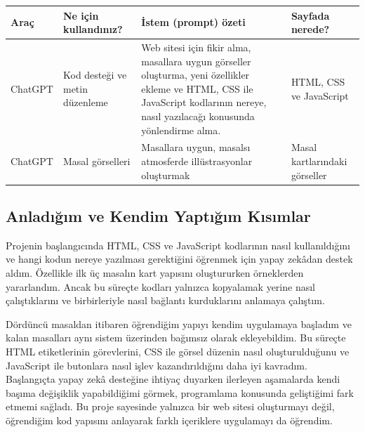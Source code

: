 \documentclass[12pt,a4paper]{article}
\begin{document}
\begin{longtable}{@{}p{2.6cm}p{3.6cm}p{4.2cm}p{3.4cm}@{}}
\toprule

\textbf{Araç} & \textbf{Ne için kullandınız?} & \textbf{İstem (prompt) özeti} & \textbf{Sayfada nerede?} \\
\midrule
\endhead
\relax ChatGPT & Kod desteği ve metin düzenleme & Web sitesi için fikir alma, masallara uygun görseller oluşturma, yeni özellikler ekleme ve HTML, CSS ile JavaScript kodlarının nereye, nasıl yazılacağı konusunda yönlendirme alma. & HTML, CSS ve JavaScript \\

\relax ChatGPT & Masal görselleri & Masallara uygun, masalsı atmosferde illüstrasyonlar oluşturmak & Masal kartlarındaki görseller \\

\bottomrule
\end{longtable}

\subsection{Anladığım ve Kendim Yaptığım Kısımlar}
Projenin başlangıcında HTML, CSS ve JavaScript kodlarının nasıl kullanıldığını ve hangi kodun nereye yazılması gerektiğini öğrenmek için yapay zekâdan destek aldım. Özellikle ilk üç masalın kart yapısını oluştururken örneklerden yararlandım. Ancak bu süreçte kodları yalnızca kopyalamak yerine nasıl çalıştıklarını ve birbirleriyle nasıl bağlantı kurduklarını anlamaya çalıştım.

Dördüncü masaldan itibaren öğrendiğim yapıyı kendim uygulamaya başladım ve kalan masalları aynı sistem üzerinden bağımsız olarak ekleyebildim. Bu süreçte HTML etiketlerinin görevlerini, CSS ile görsel düzenin nasıl oluşturulduğunu ve JavaScript ile butonlara nasıl işlev kazandırıldığını daha iyi kavradım. Başlangıçta yapay zekâ desteğine ihtiyaç duyarken ilerleyen aşamalarda kendi başıma değişiklik yapabildiğimi görmek, programlama konusunda geliştiğimi fark etmemi sağladı. Bu proje sayesinde yalnızca bir web sitesi oluşturmayı değil, öğrendiğim kod yapısını anlayarak farklı içeriklere uygulamayı da öğrendim.

\end{document}
